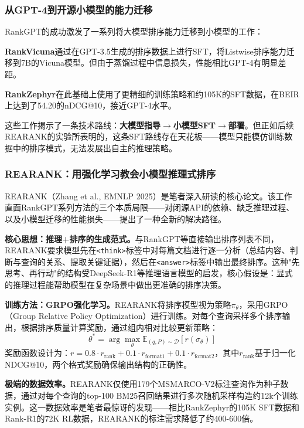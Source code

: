 \documentclass[12pt,a4paper]{article}
\begin{document}
\subsubsection{从GPT-4到开源小模型的能力迁移}

RankGPT的成功激发了一系列将大模型排序能力迁移到小模型的工作：

\textbf{RankVicuna}\cite{pradeep2023rankvicuna}通过在GPT-3.5生成的排序数据上进行SFT，将Listwise排序能力迁移到7B的Vicuna模型。但由于蒸馏过程中信息损失，性能相比GPT-4有明显差距。

\textbf{RankZephyr}\cite{pradeep2024rankzephyr}在此基础上使用了更精细的训练策略和约105K的SFT数据，在BEIR上达到了54.20的nDCG@10，接近GPT-4水平。

这些工作揭示了一条技术路线：\textbf{大模型指导$\to$小模型SFT$\to$部署}。但正如后续REARANK的实验所表明的，这条SFT路线存在天花板——模型只能模仿训练数据中的排序模式，无法发展出自主的推理策略。

\subsubsection{REARANK：用强化学习教会小模型推理式排序}

REARANK\cite{zhang2025rearank}（Zhang et al., EMNLP 2025）是笔者深入研读的核心论文。该工作直面RankGPT系列方法的三个本质局限——对闭源API的依赖、缺乏推理过程、以及小模型迁移的性能损失——提出了一种全新的解决路径。

\textbf{核心思想：推理+排序的生成范式。}与RankGPT等直接输出排序列表不同，REARANK要求模型先在\texttt{<think>}标签中对每篇文档进行逐一分析（总结内容、判断与查询的关系、提取关键证据），然后在\texttt{<answer>}标签中输出最终排序。这种"先思考、再行动"的结构受DeepSeek-R1\cite{deepseek2025r1}等推理语言模型的启发，核心假设是：显式的推理过程能帮助模型在复杂场景中做出更准确的排序决策。

\textbf{训练方法：GRPO强化学习。}REARANK将排序模型视为策略$\pi_\theta$，采用GRPO\cite{shao2024deepseekmath}（Group Relative Policy Optimization）进行训练。对每个查询采样多个排序输出，根据排序质量计算奖励，通过组内相对比较更新策略：
\begin{equation}
\theta^* = \arg\max_\theta \mathbb{E}_{(q,P)\sim\mathcal{D}}[r(\sigma_\theta)]
\end{equation}
奖励函数设计为：$r = 0.8 \cdot r_{\text{rank}} + 0.1 \cdot r_{\text{format1}} + 0.1 \cdot r_{\text{format2}}$，其中$r_{\text{rank}}$基于归一化NDCG@10，两个格式奖励确保输出结构的正确性。

\textbf{极端的数据效率。}REARANK仅使用179个MSMARCO-V2标注查询作为种子数据，通过对每个查询的top-100 BM25召回结果进行多次随机采样构造约12k个训练实例。这一数据效率是笔者最惊讶的发现——相比RankZephyr的105K SFT数据和Rank-R1的72K RL数据，REARANK的标注需求降低了约400-600倍。
\end{document}
